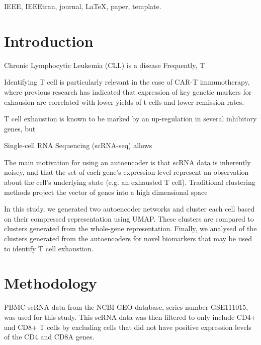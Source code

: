 \documentclass[journal]{IEEEtran}
\begin{document}
\begin{IEEEkeywords}
IEEE, IEEEtran, journal, \LaTeX, paper, template.
\end{IEEEkeywords}

%
\IEEEpeerreviewmaketitle



\section{Introduction}
Chronic Lymphocytic Leukemia (CLL) is a disease 
Frequently, T

Identifying T cell is particularly relevant in the case of CAR-T immunotherapy, where previous research has indicated that expression of key genetic markers for exhausion are correlated with lower yields of t cells and lower remission rates.

T cell exhaustion is known to be marked by an up-regulation in several inhibitory genes, but 

Single-cell RNA Sequencing (scRNA-seq) allows

The main motivation for using an autoencoder is that scRNA data is inherently noisey, and that the set of each gene's expression level represent an observation about the cell's underlying state (e.g. an exhausted T cell). Traditional clustering methods project the vector of genes into a high dimensional space

In this study, we generated two autoencoder networks and cluster each cell based on their compressed representation using UMAP. These clusters are compared to clusters generated from the whole-gene representation. Finally, we analysed of the clusters generated from the autoencoders for novel biomarkers that may be used to identify T cell exhaustion.

\section{Methodology}
PBMC scRNA data from the NCBI GEO database, series number GSE111015, was used for this study. This scRNA data was then filtered to only include CD4+ and CD8+ T cells by excluding cells that did not have positive expression levels of the CD4 and CD8A genes.
\end{document}
